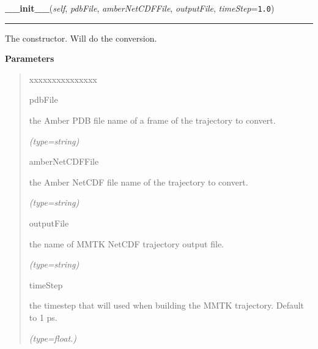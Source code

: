 \hspace{.8\funcindent}\begin{boxedminipage}{\funcwidth}

    \raggedright \textbf{\_\_init\_\_}(\textit{self}, \textit{pdbFile}, \textit{amberNetCDFFile}, \textit{outputFile}, \textit{timeStep}={\tt 1.0})

    \vspace{-1.5ex}

    \rule{\textwidth}{0.5\fboxrule}
\setlength{\parskip}{2ex}
    The constructor. Will do the conversion.

\setlength{\parskip}{1ex}
      \textbf{Parameters}
      \vspace{-1ex}

      \begin{quote}
        \begin{Ventry}{xxxxxxxxxxxxxxx}

          \item[pdbFile]

          the Amber PDB file name of a frame of the trajectory to convert.

            {\it (type=string)}

          \item[amberNetCDFFile]

          the Amber NetCDF file name of the trajectory to convert.

            {\it (type=string)}

          \item[outputFile]

          the name of MMTK NetCDF trajectory output file.

            {\it (type=string)}

          \item[timeStep]

          the timestep that will used when building the MMTK trajectory. 
          Default to 1 ps.

            {\it (type=float.)}

        \end{Ventry}

      \end{quote}

    \end{boxedminipage}



